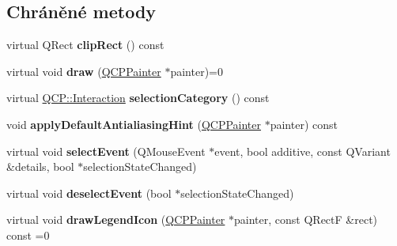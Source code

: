 \subsection*{Chráněné metody}
\begin{DoxyCompactItemize}
\item 
\hypertarget{classQCPAbstractPlottable_ac01960b0827913922f5364d559c124ed}{}virtual Q\+Rect {\bfseries clip\+Rect} () const \label{classQCPAbstractPlottable_ac01960b0827913922f5364d559c124ed}

\item 
\hypertarget{classQCPAbstractPlottable_acbab5e30dcd04fd302b4a5902ac2c482}{}virtual void {\bfseries draw} (\hyperlink{classQCPPainter}{Q\+C\+P\+Painter} $\ast$painter)=0\label{classQCPAbstractPlottable_acbab5e30dcd04fd302b4a5902ac2c482}

\item 
\hypertarget{classQCPAbstractPlottable_a5eef607bcc2aee8bfe2380a8710f6c64}{}virtual \hyperlink{namespaceQCP_a2ad6bb6281c7c2d593d4277b44c2b037}{Q\+C\+P\+::\+Interaction} {\bfseries selection\+Category} () const \label{classQCPAbstractPlottable_a5eef607bcc2aee8bfe2380a8710f6c64}

\item 
\hypertarget{classQCPAbstractPlottable_a76e9d6cc7972dc1528f526d163766aca}{}void {\bfseries apply\+Default\+Antialiasing\+Hint} (\hyperlink{classQCPPainter}{Q\+C\+P\+Painter} $\ast$painter) const \label{classQCPAbstractPlottable_a76e9d6cc7972dc1528f526d163766aca}

\item 
\hypertarget{classQCPAbstractPlottable_a16aaad02456aa23a759efd1ac90c79bf}{}virtual void {\bfseries select\+Event} (Q\+Mouse\+Event $\ast$event, bool additive, const Q\+Variant \&details, bool $\ast$selection\+State\+Changed)\label{classQCPAbstractPlottable_a16aaad02456aa23a759efd1ac90c79bf}

\item 
\hypertarget{classQCPAbstractPlottable_a6fa0d0f95560ea8b01ee13f296dab2b1}{}virtual void {\bfseries deselect\+Event} (bool $\ast$selection\+State\+Changed)\label{classQCPAbstractPlottable_a6fa0d0f95560ea8b01ee13f296dab2b1}

\item 
\hypertarget{classQCPAbstractPlottable_ab155d7aabf18c61253c96be69ee931c1}{}virtual void {\bfseries draw\+Legend\+Icon} (\hyperlink{classQCPPainter}{Q\+C\+P\+Painter} $\ast$painter, const Q\+Rect\+F \&rect) const  =0\label{classQCPAbstractPlottable_ab155d7aabf18c61253c96be69ee931c1}


\end{DoxyCompactItemize}
